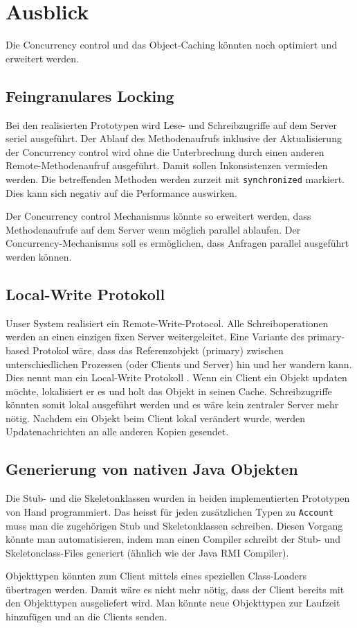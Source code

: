 \chapter{Ausblick}

Die Concurrency control und das Object-Caching könnten noch optimiert und erweitert werden.


\section{Feingranulares Locking}
\label{sec:feingr-lock}

Bei den realisierten Prototypen wird Lese- und Schreibzugriffe auf dem Server seriel ausgeführt. Der Ablauf des Methodenaufrufs inklusive der Aktualisierung der Concurrency control wird ohne die Unterbrechung durch einen anderen Remote-Methodenaufruf ausgeführt. Damit sollen Inkonsistenzen vermieden werden. Die betreffenden Methoden werden zurzeit mit \texttt{synchronized} markiert. Dies kann sich negativ auf die Performance auswirken. 

Der Concurrency control Mechanismus könnte so erweitert werden, dass Methodenaufrufe auf dem Server wenn möglich parallel ablaufen. 
Der Concurrency-Mechanismus soll es ermöglichen, dass Anfragen parallel ausgeführt werden können.

\section{Local-Write Protokoll}
\label{sec:local-write-prot}

Unser System realisiert ein Remote-Write-Protocol. Alle Schreiboperationen werden an einen einzigen fixen Server weitergeleitet.
Eine Variante des primary-based Protokol wäre, dass das Referenzobjekt (primary) zwischen unterschiedlichen Prozessen (oder Clients und Server) hin und her wandern kann. Dies nennt man ein Local-Write Protokoll \cite{tanenbaum07}. Wenn ein Client ein Objekt updaten möchte, lokalisiert er es und holt das Objekt in seinen Cache. Schreibzugriffe könnten somit lokal ausgeführt werden und es wäre kein zentraler Server mehr nötig. Nachdem ein Objekt beim Client lokal verändert wurde, werden Updatenachrichten an alle anderen Kopien gesendet.

\section{Generierung von nativen Java Objekten}
\label{sec:gener-von-nativ}

Die Stub- und die Skeletonklassen wurden in beiden implementierten Prototypen von Hand programmiert. Das heisst für jeden zusätzlichen Typen zu \texttt{Account} muss man die zugehörigen Stub und Skeletonklassen schreiben. Diesen Vorgang könnte man automatisieren, indem man einen Compiler schreibt der Stub- und Skeletonclass-Files generiert (ähnlich wie der Java RMI Compiler).

Objekttypen könnten zum Client mittels eines speziellen Class-Loaders übertragen werden. Damit wäre es nicht mehr nötig, dass der Client bereits mit den Objekttypen ausgeliefert wird. Man könnte neue Objekttypen zur Laufzeit hinzufügen und an die Clients senden.